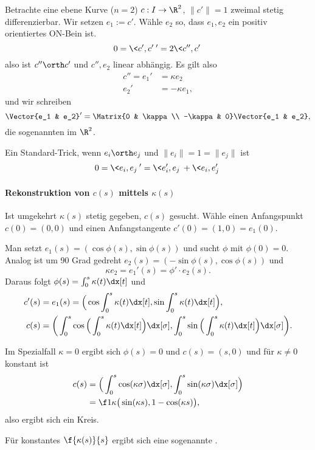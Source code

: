 Betrachte eine ebene Kurve ($n=2$) $c: I \to \R^2$, $\|c'\| = 1$ zweimal stetig differenzierbar.
Wir setzen $e_1 := c'$.
Wähle $e_2$ so, dass $e_1, e_2$ ein positiv orientiertes ON-Bein ist.
\[
	0
	= \<c', c'\>'
	= 2 \<c'', c'\>
\]
also ist $c'' \orth c'$ und $c'', e_2$ linear abhängig.
Es gilt also
\begin{align*}
	c'' = e_1' &= \kappa e_2 \\
	e_2' &= -\kappa e_1,
\end{align*}
und wir schreiben
\[
	\Vector{e_1 & e_2}'
	= \Matrix{0 & \kappa \\ -\kappa & 0}
	\Vector{e_1 & e_2},
\]
die sogenannten  im $\R^2$.

Ein Standard-Trick, wenn $e_i \orth e_j$ und $\|e_i\| = 1 = \|e_j\|$ ist
\[
	0 = \<e_i, e_j\>'
	= \<e_i', e_j\> + \<e_i, e_j'\>
\]

\paragraph{Rekonstruktion von $c(s)$ mittels $\kappa(s)$}

Ist umgekehrt $\kappa(s)$ stetig gegeben, $c(s)$ gesucht.
Wähle einen Anfangspunkt $c(0) = (0,0)$ und einen Anfangstangente $c'(0) = (1,0) = e_1(0)$.

Man setzt $e_1(s) = (\cos \phi(s), \sin \phi(s))$ und sucht $\phi$ mit $\phi(0) = 0$.
Analog ist um 90 Grad gedreht $e_2(s) = (-\sin \phi(s), \cos \phi(s))$ und
\[
	\kappa e_2
	= e_1' (s)
	= \phi'\cdot e_2 (s).
\]
Daraus folgt $\phi(s) = \int_0^s \kappa(t) \dx[t]$ und
\begin{align*}
	c'(s) &= e_1(s) = \Big( \cos \int_0^s \kappa(t) \dx[t], \sin \int_0^s \kappa(t) \dx[t] \Big), \\
	c(s) &= \bigg( \int_0^s \cos \Big( \int_0^s \kappa(t) \dx[t]\Big) \dx[\sigma], \int_0^s \sin \Big( \int_0^s \kappa(t) \dx[t] \Big) \dx[\sigma] \bigg).
\end{align*}

Im Spezialfall $\kappa = 0$ ergibt sich $\phi(s) = 0$ und $c(s) = (s, 0)$ und für $\kappa \neq 0$ konstant ist
\begin{align*}
	c(s) &= \Big( \int_0^s \cos (\kappa \sigma) \dx[\sigma] , \int_0^s \sin(\kappa \sigma) \dx[\sigma] \Big) \\
	&= \f 1\kappa \big( \sin (\kappa s), 1 - \cos (\kappa s) \big),
\end{align*}
also ergibt sich ein Kreis.

Für konstantes $\f{\kappa(s)}{s}$ ergibt sich eine sogenannte .


